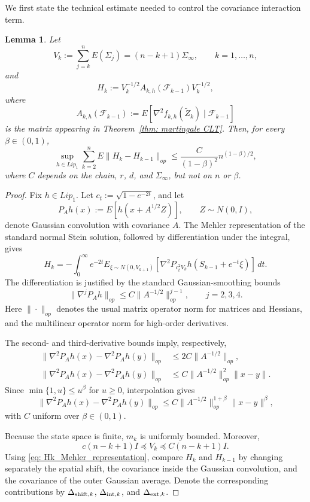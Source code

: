 \documentclass[10pt,a4paper]{article}
\newtheorem{lemma}{Lemma}
\begin{document}
We first state the technical estimate needed to control the covariance
interaction term.

\begin{lemma}
\label{lem: H_variation}
Let
\[
    V_k:=\sum_{j=k}^n E(\Sigma_j)=(n-k+1)\Sigma_\infty,
    \qquad k=1,\ldots,n,
\]
and
\[
    H_k:=V_k^{-1/2}A_{k,h}(\mathcal F_{k-1})V_k^{-1/2},
\]
where
\[
    A_{k,h}(\mathcal F_{k-1})
    :=E[\nabla^2f_{k,h}(\widetilde Z_k)\mid\mathcal F_{k-1}]
\]
is the matrix appearing in Theorem~\ref{thm: martingale CLT}. Then, for every
$\beta\in(0,1)$,
\[
    \sup_{h\in Lip_1}\sum_{k=2}^nE\|H_k-H_{k-1}\|_{op}
    \le \frac{C}{(1-\beta)^2}n^{(1-\beta)/2},
\]
where $C$ depends on the chain, $r$, $d$, and $\Sigma_\infty$, but not on
$n$ or $\beta$.
\end{lemma}

\begin{proof}
Fix $h\in Lip_1$. Let $c_t:=\sqrt{1-e^{-2t}}$, and let
\[
    P_Ah(x):=E[h(x+A^{1/2}Z)],\qquad Z\sim N(0,I),
\]
denote Gaussian convolution with covariance $A$. The Mehler representation
of the standard normal Stein solution, followed by differentiation under the
integral, gives
\begin{equation}\label{eq: Hk_Mehler_representation}
    H_k=-\int_0^\infty e^{-2t}
    E_{\xi\sim N(0,V_{k+1})}
    [\nabla^2P_{c_t^2V_k}h(S_{k-1}+e^{-t}\xi)]\,dt.
\end{equation}
The differentiation is justified by the standard Gaussian-smoothing bounds
\[
    \|\nabla^jP_Ah\|_{op}
    \le C\|A^{-1/2}\|_{op}^{j-1},\qquad j=2,3,4.
\]
Here $\|\cdot\|_{op}$ denotes the usual matrix operator norm for matrices and Hessians, and the multilinear operator norm for high-order derivatives.


The second- and third-derivative bounds imply, respectively,
\[
\begin{split}
\|\nabla^2P_Ah(x)-\nabla^2P_Ah(y)\|_{op}
&\le 2C\|A^{-1/2}\|_{op},\\
\|\nabla^2P_Ah(x)-\nabla^2P_Ah(y)\|_{op}
&\le C\|A^{-1/2}\|_{op}^2\|x-y\|.
\end{split}
\]
Since $\min\{1,u\}\le u^\beta$ for $u\ge0$, interpolation gives
\begin{equation}\label{eq: uniform_fractional_smoothing}
\|\nabla^2P_Ah(x)-\nabla^2P_Ah(y)\|_{op}
\le C\|A^{-1/2}\|_{op}^{1+\beta}\|x-y\|^\beta,
\end{equation}
with $C$ uniform over $\beta\in(0,1)$.

Because the state space is finite, $m_k$ is uniformly bounded. Moreover,
\[
    c(n-k+1)I\preceq V_k\preceq C(n-k+1)I.
\]
Using \eqref{eq: Hk_Mehler_representation}, compare $H_k$ and $H_{k-1}$ by
changing separately the spatial shift, the covariance inside the Gaussian
convolution, and the covariance of the outer Gaussian average. Denote the
corresponding contributions by $\Delta_{{\rm shift},k}$,
$\Delta_{{\rm int},k}$, and $\Delta_{{\rm ext},k}$.


\end{proof}
\end{document}
